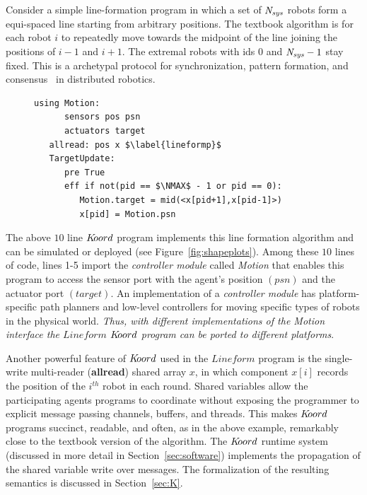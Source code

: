 Consider a simple line-formation program in which a set of $\mathit{N_{sys}}$ robots form a equi-spaced line starting from arbitrary positions. The textbook algorithm is for each robot $i$ to repeatedly move towards the midpoint of the line joining the positions of $i-1$ and $i+1$. The extremal robots with ids $0$ and $\mathit{N_{sys}} -1$ stay fixed. This is a archetypal protocol for synchronization, pattern formation, and consensus~\cite{Tsitsiklis:1986,Blondel,Magnusbook2010,Fax} in distributed robotics.
%
\begin{figure}
\begin{lstlisting}[label=lineform,caption=Lineform $\lgname$ program]
   using Motion:
      sensors pos psn
      actuators target
   allread: pos x $\label{lineformp}$
   TargetUpdate:
      pre True
      eff if not(pid == $\NMAX$ - 1 or pid == 0):
         Motion.target = mid(<x[pid+1],x[pid-1]>)
         x[pid] = Motion.psn
\end{lstlisting}
\end{figure}
The above $10$ line  $K\kern-2pt oord$ program implements this line formation algorithm and can be simulated or deployed (see Figure~\ref{fig:shapeplots}). Among these $10$ lines of code, lines 1-5 import the {\em controller module\/} called {\em Motion\/} that enables this program to access the sensor port with the agent's position $(\mathit{psn})$ and the actuator port $(\mathit{target})$. An implementation of  a {\em controller module\/} has platform-specific path planners and low-level controllers for moving specific types of robots in the physical world. {\em Thus, with different implementations of the {\em Motion\/} interface the $\mathit{Lineform}$ $K\kern-2pt oord$  program can be ported to different platforms\/}. 

Another powerful feature of $K\kern-2pt oord$ used in the $\mathit{Lineform}$ program is the single-write multi-reader ({\bf allread}) shared array $x$, in which component $x[i]$ records the position of the $i^{th}$ robot in each round.  Shared variables allow the participating agents programs to coordinate without exposing the programmer to explicit message passing channels, buffers, and threads. This makes $K\kern-2pt oord$ programs succinct, readable, and often, as in the  above example, remarkably close to the textbook version of the algorithm. The $K\kern-2pt oord$ runtime system (discussed in more detail in Section~\ref{sec:software}) implements the propagation of  the shared variable write over messages. The formalization of the resulting semantics is discussed in Section~\ref{sec:K}.

